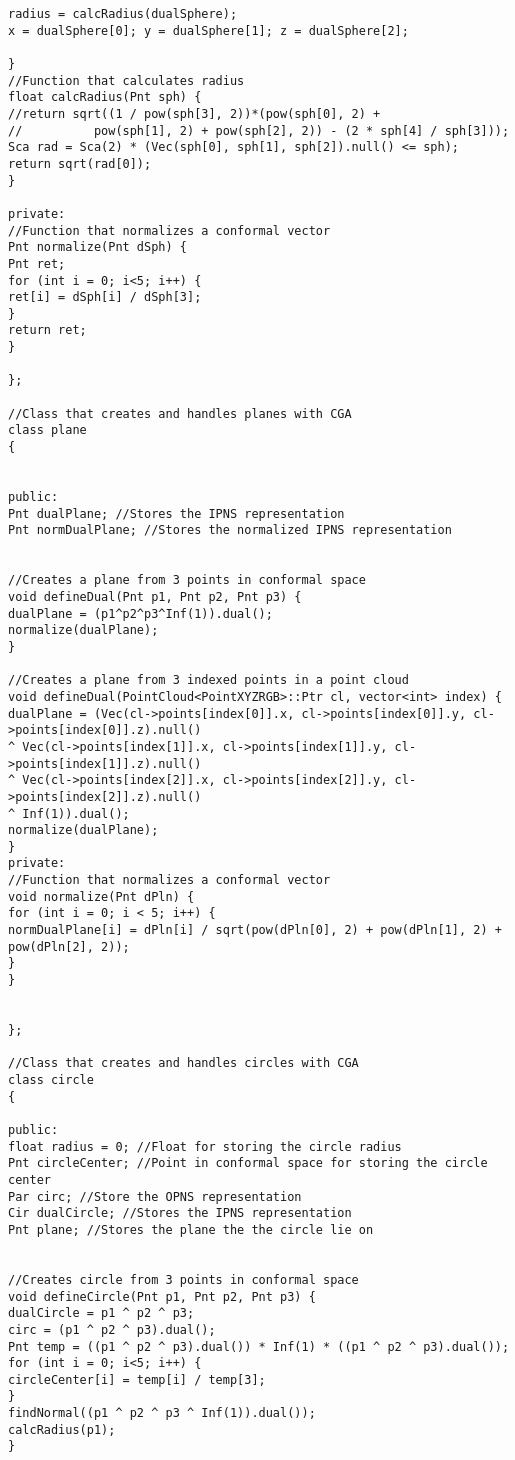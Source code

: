 {\begin{lstlisting}[caption={Archivo objects.h}]
radius = calcRadius(dualSphere);
x = dualSphere[0]; y = dualSphere[1]; z = dualSphere[2];

}
//Function that calculates radius
float calcRadius(Pnt sph) {
//return sqrt((1 / pow(sph[3], 2))*(pow(sph[0], 2) + 
//			pow(sph[1], 2) + pow(sph[2], 2)) - (2 * sph[4] / sph[3]));
Sca rad = Sca(2) * (Vec(sph[0], sph[1], sph[2]).null() <= sph);
return sqrt(rad[0]);
}

private:
//Function that normalizes a conformal vector
Pnt normalize(Pnt dSph) {
Pnt ret;
for (int i = 0; i<5; i++) {
ret[i] = dSph[i] / dSph[3];
}
return ret;
}

};

//Class that creates and handles planes with CGA
class plane
{


public:
Pnt dualPlane; //Stores the IPNS representation
Pnt normDualPlane; //Stores the normalized IPNS representation


//Creates a plane from 3 points in conformal space
void defineDual(Pnt p1, Pnt p2, Pnt p3) {
dualPlane = (p1^p2^p3^Inf(1)).dual();
normalize(dualPlane);
}

//Creates a plane from 3 indexed points in a point cloud
void defineDual(PointCloud<PointXYZRGB>::Ptr cl, vector<int> index) {
dualPlane = (Vec(cl->points[index[0]].x, cl->points[index[0]].y, cl->points[index[0]].z).null()
^ Vec(cl->points[index[1]].x, cl->points[index[1]].y, cl->points[index[1]].z).null()
^ Vec(cl->points[index[2]].x, cl->points[index[2]].y, cl->points[index[2]].z).null()
^ Inf(1)).dual();
normalize(dualPlane);
}
private:
//Function that normalizes a conformal vector
void normalize(Pnt dPln) {
for (int i = 0; i < 5; i++) {
normDualPlane[i] = dPln[i] / sqrt(pow(dPln[0], 2) + pow(dPln[1], 2) + pow(dPln[2], 2));
}
}


};

//Class that creates and handles circles with CGA
class circle
{

public:
float radius = 0; //Float for storing the circle radius
Pnt circleCenter; //Point in conformal space for storing the circle center
Par circ; //Store the OPNS representation
Cir dualCircle; //Stores the IPNS representation
Pnt plane; //Stores the plane the the circle lie on


//Creates circle from 3 points in conformal space
void defineCircle(Pnt p1, Pnt p2, Pnt p3) {
dualCircle = p1 ^ p2 ^ p3;
circ = (p1 ^ p2 ^ p3).dual();
Pnt temp = ((p1 ^ p2 ^ p3).dual()) * Inf(1) * ((p1 ^ p2 ^ p3).dual());
for (int i = 0; i<5; i++) {
circleCenter[i] = temp[i] / temp[3];
}
findNormal((p1 ^ p2 ^ p3 ^ Inf(1)).dual());
calcRadius(p1);
}


\end{lstlisting}}
